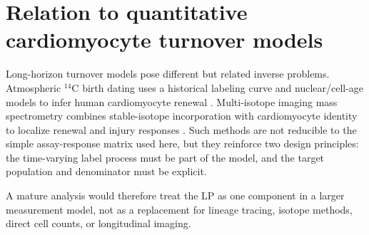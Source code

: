 \documentclass[11pt]{article}
\begin{document}
\section{Relation to quantitative cardiomyocyte turnover models}
Long-horizon turnover models pose different but related inverse problems. Atmospheric $^{14}$C birth dating uses a historical labeling curve and nuclear/cell-age models to infer human cardiomyocyte renewal \citep{Bergmann2009}. Multi-isotope imaging mass spectrometry combines stable-isotope incorporation with cardiomyocyte identity to localize renewal and injury responses \citep{Senyo2013}. Such methods are not reducible to the simple assay-response matrix used here, but they reinforce two design principles: the time-varying label process must be part of the model, and the target population and denominator must be explicit.

A mature analysis would therefore treat the LP as one component in a larger measurement model, not as a replacement for lineage tracing, isotope methods, direct cell counts, or longitudinal imaging.
\end{document}
